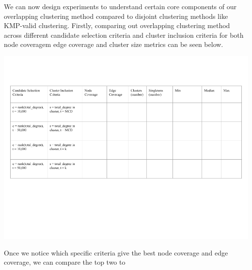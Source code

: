 \documentclass{article}
\begin{document}
We can now design experiments to understand certain core components of our overlapping clustering method compared to disjoint clustering methods like KMP-valid clustering. Firstly, comparing out overlapping clustering method across different candidate selection criteria and cluster inclusion criteria for both node coveragem edge coverage and cluster size metrics can be seen below. 
\begin{center}
    \includegraphics[trim={0 7cm 0 3cm},clip, scale=0.5]{Overlapping Clusters Tables.png}
\end{center}
\newline\newline

Once we notice which specific criteria give the best node coverage and edge coverage, we can compare the top two to 
\end{document}
